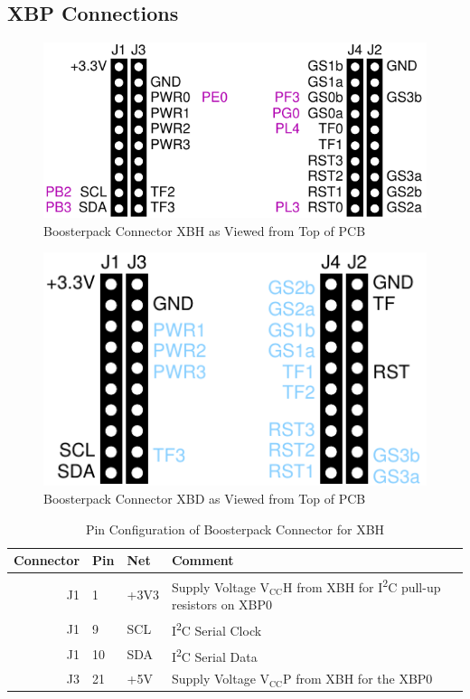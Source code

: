 \documentclass[twoside,11pt]{cergdoc}
\newcommand{\ITwoC}{I\textsuperscript{2}C }
\begin{document}
\begin{appendix}
\chapter{XBP Connections}

\begin{figure}[ht]
  \begin{center}
    \includegraphics[scale=1]{figures/xbp-xbh}
    \caption{Boosterpack Connector XBH as Viewed from Top of PCB}
  \end{center}
\end{figure}

\begin{figure}[ht]
  \begin{center}
    \includegraphics[scale=1]{figures/xbp-xbd}
    \caption{Boosterpack Connector XBD as Viewed from Top of PCB}
  \end{center}
\end{figure}
\begin{table}[ht]
  \begin{center}
    \caption{Pin Configuration of Boosterpack Connector for XBH}
    \begin{tabular}{rlll}
      Connector & Pin  & Net         & Comment  \\ \hline
       J1 & 1  & +3V3      & Supply Voltage $\mathrm{V_{CC}H}$ from XBH for \ITwoC pull-up resistors on XBP0 \\
       J1 & 9  & SCL       & \ITwoC Serial Clock  \\
       J1 & 10 & SDA       & \ITwoC Serial Data \\ 
       J3 & 21 & +5V       & Supply Voltage $\mathrm{V_{CC}P}$ from XBH for the XBP0 \\ \hline


\end{tabular}
\end{center}
\end{table}
\end{appendix}
\end{document}
